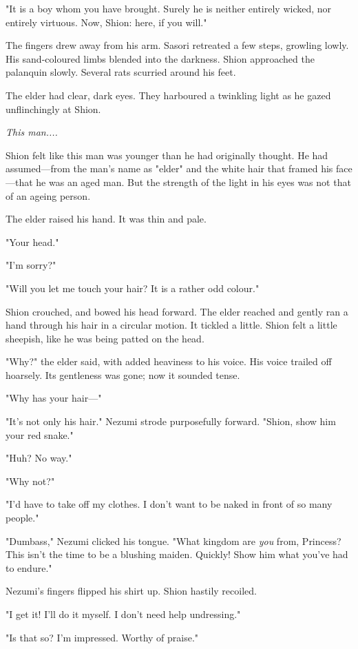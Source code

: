 "It is a boy whom you have brought. Surely he is neither entirely
wicked, nor entirely virtuous. Now, Shion: here, if you will."

The fingers drew away from his arm. Sasori retreated a few steps,
growling lowly. His sand-coloured limbs blended into the darkness. Shion
approached the palanquin slowly. Several rats scurried around his feet.~

The elder had clear, dark eyes. They harboured a twinkling light as he
gazed unflinchingly at Shion.

\emph{This man....}

Shion felt like this man was younger than he had originally thought. He
had assumed---from the man's name as "elder" and the white hair that
framed his face---that he was an aged man. But the strength of the light
in his eyes was not that of an ageing person.

The elder raised his hand. It was thin and pale.

"Your head."

"I'm sorry?"

"Will you let me touch your hair? It is a rather odd colour."

Shion crouched, and bowed his head forward. The elder reached and gently
ran a hand through his hair in a circular motion. It tickled a little.
Shion felt a little sheepish, like he was being patted on the head.

"Why?" the elder said, with added heaviness to his voice. His voice
trailed off hoarsely. Its gentleness was gone; now it sounded tense.

"Why has your hair---"

"It's not only his hair." Nezumi strode purposefully forward. "Shion,
show him your red snake."

"Huh? No way."

"Why not?"

"I'd have to take off my clothes. I don't want to be naked in front of
so many people."

"Dumbass," Nezumi clicked his tongue. "What kingdom are \emph{you} from,
Princess? This isn't the time to be a blushing maiden. Quickly! Show him
what you've had to endure."

Nezumi's fingers flipped his shirt up. Shion hastily recoiled.

"I get it! I'll do it myself. I don't need help undressing."

"Is that so? I'm impressed. Worthy of praise."

